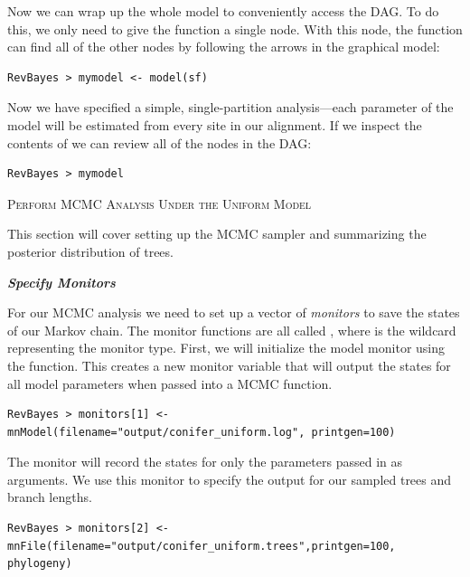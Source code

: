 Now we can wrap up the whole model to conveniently access the DAG. To do this, we only need to give the  function a single node. With this node, the  function can find all of the other nodes by following the arrows in the graphical model:
{\tt \begin{snugshade*}
\begin{lstlisting}
RevBayes > mymodel <- model(sf)
\end{lstlisting}
\end{snugshade*}}

Now we have specified a simple, single-partition analysis---each parameter of the model will be estimated from every site in our alignment.
If we inspect the contents of  we can review all of the nodes in the DAG:
{\tt \begin{snugshade*}
\begin{lstlisting}
RevBayes > mymodel
\end{lstlisting}
\end{snugshade*}}

\bigskip
{\large \textcolor{mycol}{\textsc{Perform MCMC Analysis Under the Uniform Model}}}

This section will cover setting up the MCMC sampler and summarizing the posterior distribution of trees. 

\textbf{\textit{Specify Monitors}}

For our MCMC analysis we need to set up a vector of \textit{monitors} to save the states of our Markov chain. 
The monitor functions are all called , where \cl{*} is the wildcard representing the monitor type.
First, we will initialize the model monitor using the  function. This creates a new monitor variable that will output the states for all model parameters when passed into a MCMC function. 
{\tt \begin{snugshade*}
\begin{lstlisting}
RevBayes > monitors[1] <- mnModel(filename="output/conifer_uniform.log", printgen=100)
\end{lstlisting}
\end{snugshade*}}

The  monitor will record the states for only the parameters passed in as arguments. We use this monitor to specify the output for our sampled trees and branch lengths.

{\tt \begin{snugshade*}
\begin{lstlisting}
RevBayes > monitors[2] <- mnFile(filename="output/conifer_uniform.trees",printgen=100, phylogeny)
\end{lstlisting}
\end{snugshade*}}


